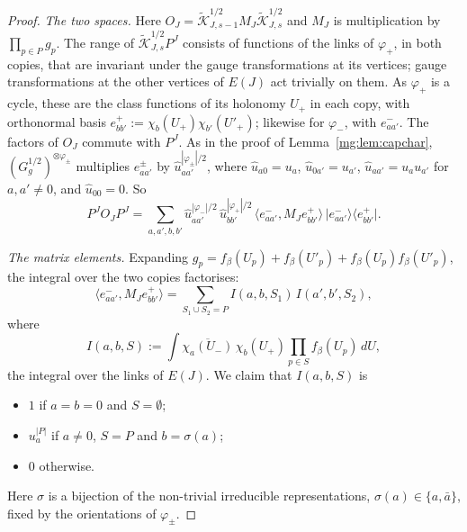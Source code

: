 \documentclass[11pt,a4paper]{article}
\theoremstyle{definition}
\theoremstyle{remark}
\newcommand{\dU}{\,dU}
\begin{document}
\begin{proof}
\emph{The two spaces.} Here $O_J=\tilde{\mathcal K}^{1/2}_{J,s-1}M_J\tilde{\mathcal K}^{1/2}_{J,s}$ and $M_J$ is multiplication by $\prod_{p\in P}g_p$. The range of
$\tilde{\mathcal K}^{1/2}_{J,s}P^J$ consists of functions of the links of $\varphi_+$, in both copies, that are invariant under the gauge transformations at its
vertices; gauge transformations at the other vertices of $E(J)$ act trivially on them. As $\varphi_+$ is a cycle, these are the class functions of its holonomy
$U_+$ in each copy, with orthonormal basis $e^+_{bb'}:=\chi_b(U_+)\chi_{b'}(U'_+)$; likewise for $\varphi_-$, with $e^-_{aa'}$. The factors of $O_J$ commute with $P^J$.
As in the proof of Lemma~\ref{mg:lem:capchar}, $(G_g^{1/2})^{\otimes\varphi_\pm}$ multiplies $e^\pm_{aa'}$ by $\hat u_{aa'}^{|\varphi_\pm|/2}$, where $\hat u_{a0}=u_a$, $\hat u_{0a'}=u_{a'}$,
$\hat u_{aa'}=u_au_{a'}$ for $a,a'\ne0$, and $\hat u_{00}=0$. So
\[
P^JO_JP^J=\sum_{a,a',b,b'}\hat u_{aa'}^{|\varphi_-|/2}\,\hat u_{bb'}^{|\varphi_+|/2}\,\bigl\langle e^-_{aa'},M_Je^+_{bb'}\bigr\rangle\,\bigl|e^-_{aa'}\bigr\rangle\bigl\langle e^+_{bb'}\bigr| .
\]

\emph{The matrix elements.} Expanding $g_p=f_\beta(U_p)+f_\beta(U'_p)+f_\beta(U_p)f_\beta(U'_p)$, the integral over the two copies factorises:
\[
\bigl\langle e^-_{aa'},M_Je^+_{bb'}\bigr\rangle=\sum_{S_1\cup S_2=P}I(a,b,S_1)\,I(a',b',S_2),
\]
where
\[
I(a,b,S):=\int\overline{\chi_a(U_-)}\,\chi_b(U_+)\prod_{p\in S}f_\beta(U_p)\dU,
\]
the integral over the links of $E(J)$. We claim that $I(a,b,S)$ is
\begin{itemize}
\item $1$ if $a=b=0$ and $S=\emptyset$;
\item $u_a^{|P|}$ if $a\ne0$, $S=P$ and $b=\sigma(a)$;
\item $0$ otherwise.
\end{itemize}
Here $\sigma$ is a bijection of the non-trivial irreducible representations, $\sigma(a)\in\{a,\bar a\}$, fixed by the orientations of $\varphi_\pm$.


\end{proof}
\end{document}
